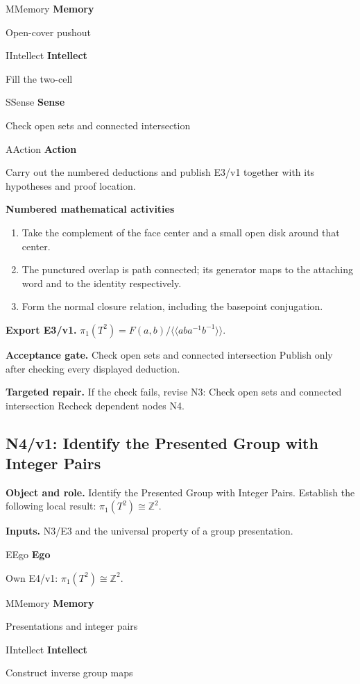 \documentclass[preprint,12pt,aps,pra,showkeys,amsmath,amssymb,superscriptaddress,floatfix]{revtex4-2}
\theoremstyle{definition}
\theoremstyle{remark}
\newcommand{\mmfaculty}[3]{%
 \begin{mmfacultybox}{#1}{#2}
 {\sffamily\bfseries\color{MMBlue}#2}\par\smallskip #3
 \end{mmfacultybox}}
\newcommand{\field}[2]{\par\smallskip\noindent\textbf{#1.} #2\par}
\begin{document}
\mmfaculty{M}{Memory}{Open-cover pushout}

\mmfaculty{I}{Intellect}{Fill the two-cell}

\mmfaculty{S}{Sense}{Check open sets and connected intersection}

\mmfaculty{A}{Action}{Carry out the numbered deductions and publish E3/v1 together with its
hypotheses and proof location.}

\smallskip\noindent\textbf{Numbered mathematical activities}

\begin{enumerate}[label=N3.\arabic*,leftmargin=3.4em]

\item Take the complement of the face center and a small open disk around that
center.

\item The punctured overlap is path connected; its generator maps to the
attaching word and to the identity respectively.

\item Form the normal closure relation, including the basepoint conjugation.

\end{enumerate}

\field{Export E3/v1}{\(\pi_1(T^2)=F(a,b)/\langle\!\langle aba^{-1}b^{-1}\rangle\!\rangle\).}

\field{Acceptance gate}{Check open sets and connected intersection Publish only after checking
every displayed deduction.}

\field{Targeted repair}{If the check fails, revise N3: Check open sets and connected
intersection Recheck dependent nodes N4.}

\clearpage

\subsection{N4/v1: Identify the Presented Group with Integer Pairs}

\field{Object and role}{Identify the Presented Group with Integer Pairs. Establish the following
local result: \(\pi_1(T^2)\cong\mathbb Z^2\).}

\field{Inputs}{N3/E3 and the universal property of a group presentation.}

\mmfaculty{E}{Ego}{Own E4/v1: \(\pi_1(T^2)\cong\mathbb Z^2\).}

\mmfaculty{M}{Memory}{Presentations and integer pairs}

\mmfaculty{I}{Intellect}{Construct inverse group maps}
\end{document}
